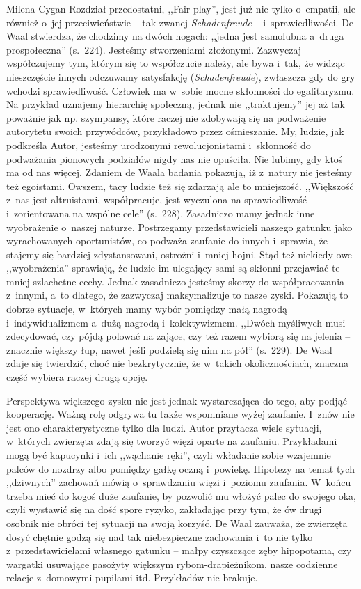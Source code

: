 \begin{recplenv}{Milena Cygan}
Rozdział przedostatni, ,,Fair play'', jest już nie tylko o~empatii, ale również o~jej przeciwieństwie -- tak zwanej
\textit{Schadenfreude} -- i~sprawiedliwości. De Waal stwierdza, że chodzimy na dwóch nogach: ,,jedna jest
samolubna a~druga prospołeczna'' (s.~224). Jesteśmy stworzeniami złożonymi. Zazwyczaj współczujemy tym, którym się to współczucie
należy, ale bywa i~tak, że widząc nieszczęście innych odczuwamy satysfakcję (\textit{Schadenfreude}), zwłaszcza gdy do
gry wchodzi sprawiedliwość. Człowiek ma w~sobie mocne skłonności do egalitaryzmu. Na przykład uznajemy hierarchię
społeczną, jednak nie ,,traktujemy'' jej aż tak poważnie jak np. szympansy, które raczej nie zdobywają się na podważenie
autorytetu swoich przywódców, przykładowo przez ośmieszanie. My, ludzie, jak podkreśla Autor, jesteśmy urodzonymi
rewolucjonistami i~skłonność do podważania pionowych podziałów nigdy nas nie opuściła. Nie lubimy, gdy ktoś ma od nas
więcej. Zdaniem de Waala badania pokazują, iż z~natury nie jesteśmy też egoistami. Owszem, tacy ludzie też się zdarzają
ale to mniejszość. ,,Większość z~nas jest altruistami, współpracuje, jest wyczulona na sprawiedliwość i~zorientowana na
wspólne cele'' (s.~228). Zasadniczo mamy jednak inne wyobrażenie o~naszej naturze. Postrzegamy przedstawicieli naszego
gatunku jako wyrachowanych oportunistów, co podważa zaufanie do innych i~sprawia, że stajemy się bardziej
zdystansowani, ostrożni i~mniej hojni. Stąd też niekiedy owe ,,wyobrażenia'' sprawiają, że ludzie im ulegający sami są
skłonni przejawiać te mniej szlachetne cechy. Jednak zasadniczo jesteśmy skorzy do współpracowania z~innymi, a~to
dlatego, że zazwyczaj maksymalizuje to nasze zyski. Pokazują to dobrze sytuacje, w~których mamy wybór pomiędzy małą
nagrodą i~indywidualizmem a~dużą nagrodą i~kolektywizmem. ,,Dwóch myśliwych musi zdecydować, czy pójdą polować na
zające, czy też razem wybiorą się na jelenia -- znacznie większy łup, nawet jeśli podzielą się nim na pół'' (s.~229). De
Waal zdaje się twierdzić, choć nie bezkrytycznie, że w~takich okolicznościach, znaczna część wybiera raczej drugą
opcję.

\enlargethispage{-.5\baselineskip}

Perspektywa większego zysku nie jest jednak wystarczająca do tego, aby podjąć kooperację. Ważną rolę odgrywa tu także
wspomniane wyżej zaufanie. I~znów nie jest ono charakterystyczne tylko dla ludzi. Autor przytacza wiele
sytuacji, w~których zwierzęta zdają się tworzyć więzi oparte na zaufaniu. Przykładami mogą być kapucynki i~ich ,,wąchanie ręki'',
czyli wkładanie sobie wzajemnie palców do nozdrzy albo pomiędzy gałkę oczną i~powiekę. Hipotezy na temat tych
,,dziwnych'' zachowań mówią o~sprawdzaniu więzi i~poziomu zaufania. W~końcu trzeba mieć do kogoś duże zaufanie, by
pozwolić mu włożyć palec do swojego oka, czyli wystawić się na dość spore ryzyko, zakładając przy tym, że ów drugi
osobnik nie obróci tej sytuacji na swoją korzyść. De Waal zauważa, że zwierzęta dosyć chętnie godzą się nad tak
niebezpieczne zachowania i~to nie tylko z~przedstawicielami własnego gatunku -- małpy czyszczące zęby hipopotama, czy
wargatki usuwające pasożyty większym rybom-drapieżnikom, nasze codzienne relacje z~domowymi pupilami itd. Przykładów
nie brakuje. 


\end{recplenv}
